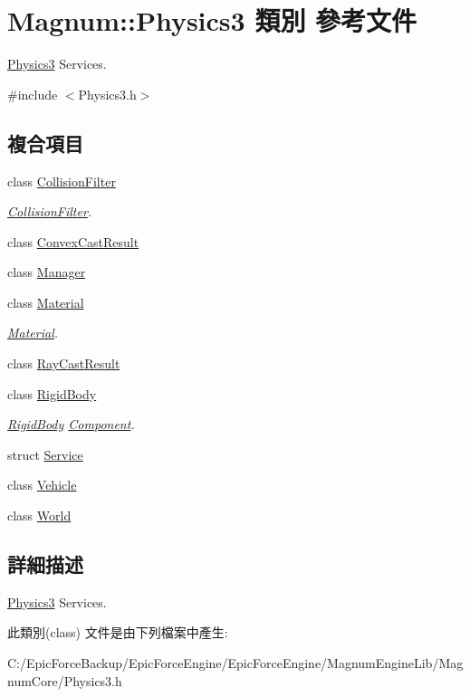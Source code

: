 \hypertarget{class_magnum_1_1_physics3}{}\section{Magnum\+:\+:Physics3 類別 參考文件}
\label{class_magnum_1_1_physics3}


\hyperlink{class_magnum_1_1_physics3}{Physics3} Services.  




{\ttfamily \#include $<$Physics3.\+h$>$}

\subsection*{複合項目}
\begin{DoxyCompactItemize}
\item 
class \hyperlink{class_magnum_1_1_physics3_1_1_collision_filter}{Collision\+Filter}
\begin{DoxyCompactList}\small\item\em \hyperlink{class_magnum_1_1_physics3_1_1_collision_filter}{Collision\+Filter}. \end{DoxyCompactList}\item 
class \hyperlink{class_magnum_1_1_physics3_1_1_convex_cast_result}{Convex\+Cast\+Result}
\item 
class \hyperlink{class_magnum_1_1_physics3_1_1_manager}{Manager}
\item 
class \hyperlink{class_magnum_1_1_physics3_1_1_material}{Material}
\begin{DoxyCompactList}\small\item\em \hyperlink{class_magnum_1_1_physics3_1_1_material}{Material}. \end{DoxyCompactList}\item 
class \hyperlink{class_magnum_1_1_physics3_1_1_ray_cast_result}{Ray\+Cast\+Result}
\item 
class \hyperlink{class_magnum_1_1_physics3_1_1_rigid_body}{Rigid\+Body}
\begin{DoxyCompactList}\small\item\em \hyperlink{class_magnum_1_1_physics3_1_1_rigid_body}{Rigid\+Body} \hyperlink{class_magnum_1_1_component}{Component}. \end{DoxyCompactList}\item 
struct \hyperlink{struct_magnum_1_1_physics3_1_1_service}{Service}
\item 
class \hyperlink{class_magnum_1_1_physics3_1_1_vehicle}{Vehicle}
\item 
class \hyperlink{class_magnum_1_1_physics3_1_1_world}{World}
\end{DoxyCompactItemize}


\subsection{詳細描述}
\hyperlink{class_magnum_1_1_physics3}{Physics3} Services. 

此類別(class) 文件是由下列檔案中產生\+:\begin{DoxyCompactItemize}
\item 
C\+:/\+Epic\+Force\+Backup/\+Epic\+Force\+Engine/\+Epic\+Force\+Engine/\+Magnum\+Engine\+Lib/\+Magnum\+Core/Physics3.\+h\end{DoxyCompactItemize}
